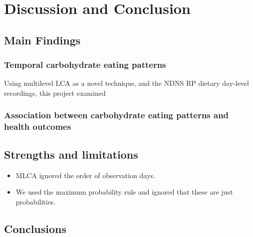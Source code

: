 
\chapter{Discussion and Conclusion} %

\label{Chapter 4} %






\section{Main Findings}

\subsection{Temporal carbohydrate eating patterns}

Using multilevel LCA as a novel technique, and the NDNS RP dietary day-level recordings, this project examined 

\subsection{Association between carbohydrate eating patterns and health outcomes}












\section{Strengths and limitations}



\begin{itemize}
	\item MLCA ignored the order of observation days.
	\item We used the maximum probability rule and ignored that these are just probabilities.
\end{itemize}



\section{Conclusions}